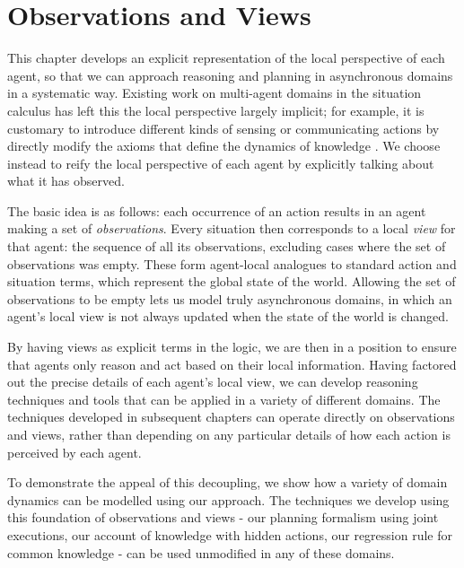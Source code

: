

\chapter{Observations and Views}

\label{ch:observations}

This chapter develops an explicit representation of the local perspective
of each agent, so that we can approach reasoning and planning in asynchronous
domains in a systematic way. Existing work on multi-agent domains
in the situation calculus has left this the local perspective largely
implicit; for example, it is customary to introduce different kinds
of sensing or communicating actions by directly modify the axioms
that define the dynamics of knowledge \citep{scherl03sc_knowledge,Lesperance99sitcalc_approach}.
We choose instead to reify the local perspective of each agent by
explicitly talking about what it has observed.

The basic idea is as follows: each occurrence of an action results
in an agent making a set of \emph{observations}. Every situation then
corresponds to a local \emph{view} for that agent: the sequence of
all its observations, excluding cases where the set of observations
was empty. These form agent-local analogues to standard action and
situation terms, which represent the global state of the world. Allowing
the set of observations to be empty lets us model truly asynchronous
domains, in which an agent's local view is not always updated when
the state of the world is changed.

By having views as explicit terms in the logic, we are then in a position
to ensure that agents only reason and act based on their local information.
Having factored out the precise details of each agent's local view,
we can develop reasoning techniques and tools that can be applied
in a variety of different domains. The techniques developed in subsequent
chapters can operate directly on observations and views, rather than
depending on any particular details of how each action is perceived
by each agent.

To demonstrate the appeal of this decoupling, we show how a variety
of domain dynamics can be modelled using our approach. The techniques
we develop using this foundation of observations and views - our planning
formalism using joint executions, our account of knowledge with hidden
actions, our regression rule for common knowledge - can be used unmodified
in any of these domains.

